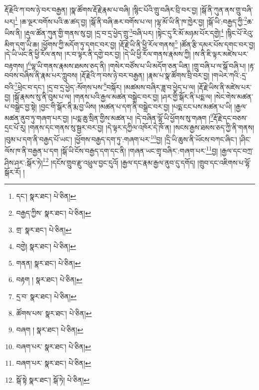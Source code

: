རྡོ་རྗེའི་ཀ་བས་ཉེ་བར་བརྒྱན། །སྣ་ཚོགས་རྡོ་རྗེ་རྣམ་པ་བཞི། །སྙིང་པོའི་གྲུ་བཞིར་བྲི་བར་བྱ། །སྒོ་ནི་ཀུན་ནས་གྲུ་བཞི་པར།\footnote{དང་།  སྣར་ཐང་།  པེ་ཅིན། } །ཆ་ལྔར་བགོས་པའི་ཆ་ཚད་བྱ། །སྒོ་ནི་བཞི་ཆར་བགོས་པ་ལ། །ལྷ་མོ་ཡི་ནི་ཁ་ཁྱེར་བྱ། །སྒོ་ཡི་:བརྒྱད་ཀྱི་\footnote{བརྒྱད་ཀྱིས་  སྣར་ཐང་།  པེ་ཅིན། }ཆ་ཡིས་ནི། །རྡུལ་ཚོན་ཀུན་གྱི་གནས་སུ་བྱ། །དྲ་བ་དྲ་ཕྱེད་གྲུ་\footnote{གྲ་  སྣར་ཐང་།  པེ་ཅིན། }བཞི་པར། །སྟེང་དུ་རི་མོ་མཉམ་པོར་དགྱེ།\footnote{བགྱེ།  སྣར་ཐང་།  པེ་ཅིན། } །སྙིང་པོ་རེའུ་མིག་དགུ་ཡི་ཆ། །ཕྱོགས་ཀྱི་མདོག་ཏུ་དགང་བར་བྱ། །རྡོ་རྗེ་ཡི་ནི་ཕྱི་རོལ་གནས།\footnote{གནན།  སྣར་ཐང་།  པེ་ཅིན། } །ཚོན་རྩི་དམར་པོས་དགང་བར་བྱ། །དེ་ཡི་ཡང་ནི་ཕྱི་རོལ་ནས། །ར་བ་ལྟར་ནི་དགྱེ་བར་བྱ། །དེ་ཡི་ཕྱི་རོལ་གནས་རྣམས་ཀྱི། །ས་ནི་ཇི་ལྟར་མཛེས་པར་བརྟགས། །\footnote{བརྟག །  སྣར་ཐང་།  པེ་ཅིན། }ལྷ་ཡི་གནས་རྣམས་ཐམས་ཅད་ནི། །གསེར་བཙོས་པ་ཡི་མདོག་ཅན་ཡིན། །གྲུ་བཞི་པ་ལ་སྒོ་བཞི་པ། །རྟ་བབས་བཞིས་ནི་རྣམ་པར་ཀླུབས། །རྡོ་རྗེའི་ཀ་བས་ཉེ་བར་བརྒྱན། །རྣམ་པ་སྣ་ཚོགས་བྲི་བར་བྱ། །གཡེར་ཀའི་:དྲ་བའི་\footnote{དྲ་བ་  སྣར་ཐང་།  པེ་ཅིན། }ཕྲེང་བ་དང་། །དྲ་བ་དྲ་ཕྱེད་:སོགས་པས་\footnote{ཚོགས་པས་  སྣར་ཐང་།  པེ་ཅིན། }བསྐོར། །མཚམས་བཞིར་ཟླ་བ་ཕྱེད་པ་ལ། །རྡོ་རྗེ་ཡིས་ནི་མཛེས་པར་བྱ། །སྒོ་རྣམས་སུ་ནི་བུམ་པ་ལ། །གནས་པའི་རྒྱལ་མཚན་བསྒྲེང་བར་བྱ། །ཤར་གྱི་སྒོར་ནི་པདྨ་ལ། །སེང་གེས་མཚན་པ་བསྒྲེང་བྱ་སྟེ། །བྱང་གི་སྒོར་ནི་རྨ་བྱ་ཡིས། །མཚན་པ་དག་ནི་བསྒྲེང་བར་བྱ། །པདྨ་ངང་པས་མཚན་པ་ཡི། །རྒྱལ་མཚན་ནུབ་ཏུ་གཞག་པར་བྱ། །པདྨ་ཆུ་སྲིན་གྱིས་མཚན་པ། །དེ་བཞིན་ལྷོ་ཡི་ཕྱོགས་སུ་གཞག །\footnote{བཞག །  སྣར་ཐང་།  པེ་ཅིན། }རྡོ་རྗེ་དང་བཅས་དྲང་པོ་རུ། །གནས་དང་གནས་སུ་སྦྱར་བར་བྱ། །དེ་ལྟར་དཀྱིལ་འཁོར་དེ་ཁོ་ན། །སངས་རྒྱས་ཐམས་ཅད་ཀྱི་ནི་གནས། །བུམ་པ་དག་ནི་བརྒྱད་པོ་ཡང་། །ཕྱོགས་བརྒྱད་དག་ཏུ་:གཞག་པར་\footnote{བཞག་པར་  སྣར་ཐང་།  པེ་ཅིན། }བྱ། །དྲི་ཡི་ཆུས་ནི་ཡོངས་བཀང་ཞིང་། །ཤིང་ལོས་ཁ་ནི་བརྒྱན་པ་དག །སྒོ་ཡི་ངོས་བརྒྱད་དག་དང་ནི། །གཞན་ཡང་གྲྭ་བཞིར་:གཞག་པར་\footnote{བཞག་པར་  སྣར་ཐང་།  པེ་ཅིན། }བྱ། །རྒྱལ་དང་བཀྲ་ཤིས་ཤར་:སྒོར་ཏེ།\footnote{སྒོ་སྟེ  སྣར་ཐང་། སྒོ་ཏེ།  པེ་ཅིན། } །དངོས་གྲུབ་རྫུ་འཕྲུལ་བྱང་དུའོ། །རྒྱལ་དང་རྣམ་རྒྱལ་ནུབ་དུ་དགོད། །གྲུབ་དང་འཇིགས་པ་ལྷོ་སྒོར་རོ། །
